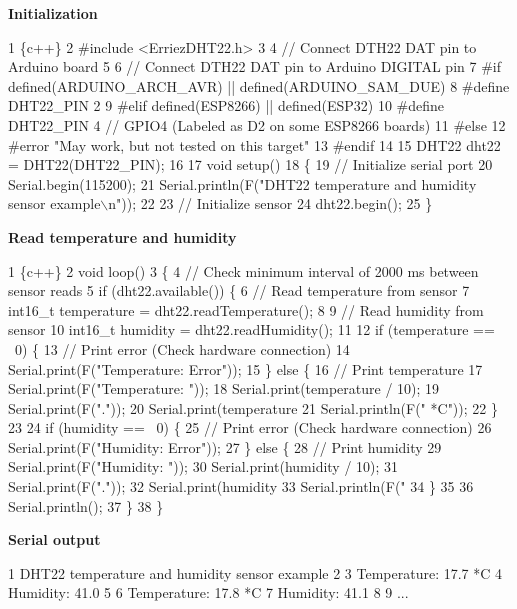 {\bfseries Initialization}


\begin{DoxyCode}
1 \{c++\}
2 #include <ErriezDHT22.h>
3 
4 // Connect DTH22 DAT pin to Arduino board
5 
6 // Connect DTH22 DAT pin to Arduino DIGITAL pin
7 #if defined(ARDUINO\_ARCH\_AVR) || defined(ARDUINO\_SAM\_DUE)
8 #define DHT22\_PIN      2
9 #elif defined(ESP8266) || defined(ESP32)
10 #define DHT22\_PIN      4 // GPIO4 (Labeled as D2 on some ESP8266 boards)
11 #else
12 #error "May work, but not tested on this target"
13 #endif
14 
15 DHT22 dht22 = DHT22(DHT22\_PIN);
16 
17 void setup()
18 \{
19     // Initialize serial port
20     Serial.begin(115200);
21     Serial.println(F("DHT22 temperature and humidity sensor example\(\backslash\)n"));
22 
23     // Initialize sensor
24     dht22.begin();
25 \}
\end{DoxyCode}


{\bfseries Read temperature and humidity}


\begin{DoxyCode}
1 \{c++\}
2 void loop()
3 \{
4     // Check minimum interval of 2000 ms between sensor reads
5     if (dht22.available()) \{
6         // Read temperature from sensor
7         int16\_t temperature = dht22.readTemperature();
8 
9         // Read humidity from sensor
10         int16\_t humidity = dht22.readHumidity();
11 
12         if (temperature == ~0) \{
13             // Print error (Check hardware connection)
14             Serial.print(F("Temperature: Error"));
15         \} else \{
16             // Print temperature
17             Serial.print(F("Temperature: "));
18             Serial.print(temperature / 10);
19             Serial.print(F("."));
20             Serial.print(temperature %
21             Serial.println(F(" *C"));
22         \}
23 
24         if (humidity == ~0) \{
25             // Print error (Check hardware connection)
26             Serial.print(F("Humidity: Error"));
27         \} else \{
28             // Print humidity
29             Serial.print(F("Humidity: "));
30             Serial.print(humidity / 10);
31             Serial.print(F("."));
32             Serial.print(humidity %
33             Serial.println(F(" %
34         \}
35 
36         Serial.println();
37       \}
38 \}
\end{DoxyCode}


{\bfseries Serial output}


\begin{DoxyCode}
1 DHT22 temperature and humidity sensor example
2 
3 Temperature: 17.7 *C
4 Humidity: 41.0 %
5 
6 Temperature: 17.8 *C
7 Humidity: 41.1 %
8 
9 ...
\end{DoxyCode}


